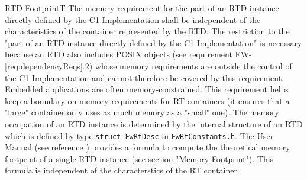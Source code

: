 \documentclass[a4paper,10pt]{article}
\newenvironment{fw_req_note}[7]
{\addtocounter{subsubsection}{1}
	\hspace{0.2cm}\textbf{FW-\arabic{section}.\arabic{subsection}.\arabic{subsubsection}/#2
	\hspace{0.8cm} #1}
	\vspace{-10pt}
\begin{longtable}{p{2.7cm}P{8.5cm}}
\hline
\textsc{Requirement} & #3 \\
\textsc{Note} & #4 \\
\textsc{Justification} & #5 \\
\textsc{Implementation} & #6  \\ 
\textsc{Verification} & #7  \\
\hline
}
{\end{longtable}}
\begin{document}
\begin{fw_req_note}{RTD Footprint}{T}
{The memory requirement for the part of an RTD instance directly defined by the C1 Implementation shall be independent of the characteristics of the container represented by the RTD.}
{The restriction to the "part of an RTD instance directly defined by the C1 Implementation" is necessary because an RTD also includes POSIX objects (see requirement FW-\ref{req:dependencyReqs}.2) whose memory requirements are outside the control of the C1 Implementation and cannot therefore be covered by this requirement.}
{Embedded applications are often memory-constrained. This requirement helps keep a boundary on memory requirements for RT containers (it ensures that a "large" container only uses as much memory as a "small" one).}
{The memory occupation of an RTD instance is determined by the internal structure of an RTD which is defined by type \texttt{struct FwRtDesc} in \texttt{FwRtConstants.h}.} 
{The User Manual (see reference \cite{ref:um}) provides a formula to compute the theoretical memory footprint of a single RTD instance (see section "Memory Footprint"). This formula is independent of the characterstics of the RT container. }
\end{fw_req_note}
\end{document}
